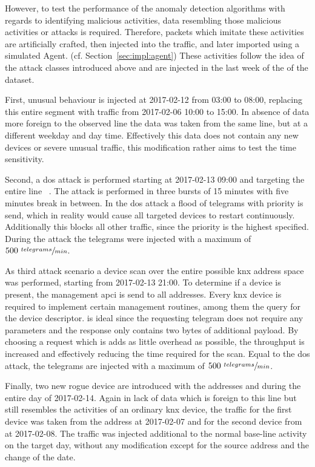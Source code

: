 However, to test the performance of the anomaly detection algorithms with regards to identifying malicious activities, data resembling those malicious activities or attacks is required.
Therefore, packets which imitate these activities are artificially crafted, then injected into the traffic, and later imported using a simulated Agent. (cf. Section~\ref{sec:impl:agent})
These activities follow the idea of the attack classes introduced above and are injected in the last week of the of the dataset.

First, unusual behaviour is injected at 2017-02-12 from 03:00 to 08:00, replacing this entire segment with traffic from 2017-02-06 10:00 to 15:00. In absence of data more foreign to the observed line the data was taken from the same line, but at a different weekday and day time. Effectively this data does not contain any new devices or severe unusual traffic, this modification rather aims to test the time sensitivity.

Second, a \gls{dos} attack is performed starting at 2017-02-13 09:00 and targeting the entire line ~. The attack is performed in three bursts of 15 minutes with five minutes break in between. In the \gls{dos} attack a flood of  telegrams with  priority is send, which in reality would cause all targeted devices to restart continuously. Additionally this blocks all other traffic, since the  priority is the highest specified. During the attack the telegrams were injected with a maximum of \(500 \ \sfrac{telegrams}{min}\).

As third attack scenario a device scan over the entire possible \gls{knx} address space was performed, starting from 2017-02-13 21:00.
To determine if a device is present, the management \gls{apci}\break{} is send to all addresses. Every \gls{knx} device is required to implement certain management routines, among them the query for the device descriptor.  is ideal since the requesting telegram does not require any parameters and the response only contains two bytes of additional payload. By choosing a request which is adds as little overhead as possible, the throughput is increased and effectively reducing the time required for the scan. \parencite[cf.][p.~46]{DIN_EN_50090-4-1}
Equal to the \gls{dos} attack, the telegrams are injected with a maximum of \(500 \ \sfrac{telegrams}{min}\).

Finally, two new rogue device are introduced with the addresses  and  during the entire day of 2017-02-14.
Again in lack of data which is foreign to this line but still resembles the activities of an ordinary \gls{knx} device, the traffic for the first device was taken from the address  at 2017-02-07 and for the second device from  at 2017-02-08.
The traffic was injected additional to the normal base-line activity on the target day, without any modification except for the source address and the change of the date.

